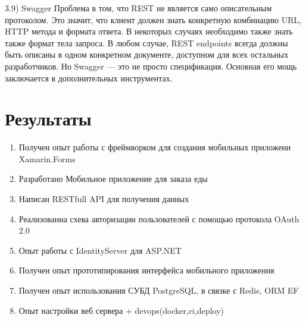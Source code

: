 \documentclass[14pt]{matmex-diploma-custom}
\begin{document}
    3.9) Swagger
    Проблема в том, что REST не является само описательным протоколом.
    Это значит, что клиент должен знать конкретную комбинацию URL, HTTP метода и формата ответа.
    В некоторых случаях необходимо также знать также формат тела запроса.
    В любом случае, REST endpoints всегда должны быть описаны в одном конкретном документе, доступном для всех остальных разработчиков.
    Но Swagger — это не просто спецификация. Основная его мощь заключается в дополнительных инструментах.

\section{Результаты}

\begin{enumerate}
    \item Получен опыт работы с фреймворком для создания мобильных приложени Xamarin.Forms
    \item Разработано Мобильное приложение для заказа еды
    \item Написан RESTfull API для получения данных
    \item Реализованна схева авторизации пользователей с помощью протокола OAuth 2.0
    \item Опыт работы с IdentityServer для ASP.NET
    \item Получен опыт прототипирования интерфейса мобильного приложения
    \item Получен опыт использования СУБД PostgreSQL, в связке с Redis, ORM EF
    \item Опыт настройки веб сервера + devops(docker,ci,deploy)
\end{enumerate}

\nocite{*}


\end{document}
